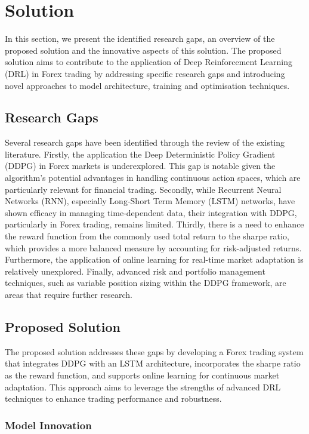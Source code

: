 \section{Solution}

In this section, we present the identified research gaps, an overview of the proposed solution and the innovative aspects of this solution. The proposed solution aims to contribute to the application of Deep Reinforcement Learning (DRL) in Forex trading by addressing specific research gaps and introducing novel approaches to model architecture, training and optimisation techniques.

\subsection{Research Gaps}

Several research gaps have been identified through the review of the existing literature. Firstly, the application the Deep Deterministic Policy Gradient (DDPG) in Forex markets is underexplored. This gap is notable given the algorithm's potential advantages in handling continuous action spaces, which are particularly relevant for financial trading. Secondly, while Recurrent Neural Networks (RNN), especially Long-Short Term Memory (LSTM) networks, have shown efficacy in managing time-dependent data, their integration with DDPG, particularly in Forex trading, remains limited. Thirdly, there is a need to enhance the reward function from the commonly used total return to the sharpe ratio, which provides a more balanced measure by accounting for risk-adjusted returns. Furthermore, the application of online learning for real-time market adaptation is relatively unexplored. Finally, advanced risk and portfolio management techniques, such as variable position sizing within the DDPG framework, are areas that require further research.

\subsection{Proposed Solution}

The proposed solution addresses these gaps by developing a Forex trading system that integrates DDPG with an LSTM architecture, incorporates the sharpe ratio as the reward function, and supports online learning for continuous market adaptation. This approach aims to leverage the strengths of advanced DRL techniques to enhance trading performance and robustness.

\subsubsection{Model Innovation}

